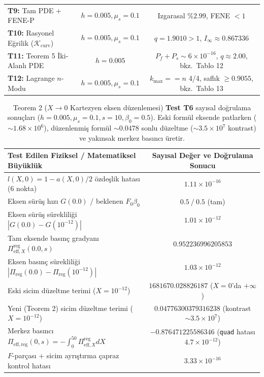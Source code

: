 \documentclass[12pt,a4paper]{article}
\begin{document}
\begin{table}[htbp]
\begin{tabularx}{\textwidth}{@{}X|c|c@{}}
\textbf{T9:} Tam PDE + FENE-P & $h=0.005, \mu_s=0.1$ & \shortstack{Izgarasal \%$2.99$, \\ FENE $< 1$} \\
\textbf{T10:} Rasyonel Eğrilik ($\mathcal{K}_{\mathrm{curv}}$) & $h=0.005, \mu_s=0.1$ & \shortstack{$q = 1.9010 > 1$, \\ $I_\infty \approx 0.867336$} \\
\textbf{T11:} Teorem 5 İki-Alanlı PDE & $h=0.005$ & \shortstack{$P_f+P_s \sim 6\times 10^{-16}$, \\ $q \approx 2.00$, bkz.\ Tablo 12} \\
\textbf{T12:} Lagrange $n$-Modu & $h=0.005, \mu_s=0.1$ & \shortstack{$k_{\max}==n$ 4/4, \\ saflık $\ge 0.9055$, bkz.\ Tablo 13} \\
\hline
\end{tabularx}
\end{table}

\begin{table}[htbp]
\centering
\footnotesize
\setlength{\tabcolsep}{2pt}
\caption{Teorem 2 ($X \to 0$ Kartezyen eksen düzenlemesi) \textbf{Test T6} sayısal doğrulama sonuçları ($h=0.005, \mu_s=0.1, s=10, \beta_0=0.5$). Eski formül eksende patlarken ($\sim 1.68 \times 10^6$), düzenlenmiş formül $\sim 0.0478$ sonlu düzeltme ($\sim 3.5 \times 10^7$ kontrast) ve yakınsak merkez basıncı üretir.}
\vspace{0.15cm}
\begin{tabular}{@{}l|c@{}}
\hline
Test Edilen Fiziksel / Matematiksel Büyüklük & Sayısal Değer ve Doğrulama Sonucu \\
\hline
$l(X,0) = 1 - a(X,0)/2$ özdeşlik hatası (6 nokta) & $1.11 \times 10^{-16}$ \\
Eksen sürüş hızı $G(0.0)$ / beklenen $F_0 \beta_0$ & $0.5 \ / \ 0.5$ (tam) \\
Eksen sürüş sürekliliği $|G(0.0) - G(10^{-12})|$ & $1.01 \times 10^{-12}$ \\
Tam eksende basınç gradyanı $\Pi_{\mathrm{eff}, X}^{\mathrm{reg}}(0.0, s)$ & $0.952236996205853$ \\
Eksen basınç sürekliliği $|\Pi_{\mathrm{reg}}(0.0) - \Pi_{\mathrm{reg}}(10^{-12})|$ & $1.03 \times 10^{-12}$ \\
Eski sicim düzeltme terimi ($X = 10^{-12}$) & $1681670.028826187$ ($X=0$'da $+\infty$) \\
\shortstack{Yeni (Teorem 2) sicim \\ düzeltme terimi ($X = 10^{-12}$)} & $0.04776300379316238$ (kontrast $\sim 3.5 \times 10^7$) \\
Merkez basıncı $\Pi_{\mathrm{eff,reg}}(0, s) = -\int_0^{50} \Pi_{\mathrm{eff}, X}^{\mathrm{reg}} dX$ & $-0.876471225586346$ (\texttt{quad} hatası $4.7 \times 10^{-12}$) \\
$F$-parçası + sicim ayrıştırma çapraz kontrol hatası & $3.33 \times 10^{-16}$ \\
\hline
\end{tabular}
\end{table}
\end{document}
